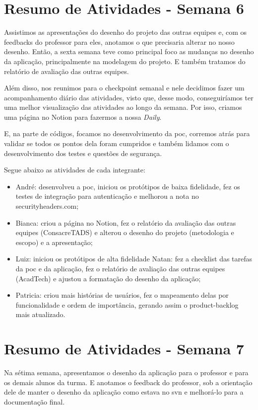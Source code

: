 \begin{apendicesenv}
\section{Resumo de Atividades - Semana 6}
Assistimos as apresentações do desenho do projeto das outras equipes e, com os \glspl{feedback} do professor para eles, anotamos o que precisaria alterar no nosso desenho. Então, a sexta semana teve como principal foco as mudanças no desenho da aplicação, principalmente na modelagem do projeto. E também tratamos do relatório de avaliação das outras equipes.

Além disso, nos reunimos para o \gls{checkpoint} semanal e nele decidimos fazer um acompanhamento diário das atividades, visto que, desse modo, conseguiríamos ter uma melhor visualização das atividades ao longo da semana. Por isso, criamos uma página no Notion para fazermos a nossa \textit{Daily}.

E, na parte de códigos, focamos no desenvolvimento da \ac{poc}, corremos atrás para validar se todos os pontos dela foram cumpridos e também lidamos com o desenvolvimento dos testes e questões de segurança.

Segue abaixo as atividades de cada integrante:

\begin{itemize}
\item André: desenvolveu a \ac{poc}, iniciou os protótipos de baixa fidelidade, fez os testes de integração para autenticação e melhorou a nota no securityheaders.com;
\item Bianca: criou a página no Notion, fez o relatório da avaliação das outras equipes (ConsacreTADS) e alterou o desenho do projeto (metodologia e escopo) e a apresentação;
\item Luiz: iniciou os protótipos de alta fidelidade
Natan: fez a \gls{checklist} das tarefas da \ac{poc} e da aplicação, fez o relatório de avaliação das outras equipes (AcadTech) e ajustou a formatação do desenho da aplicação;
\item Patricia: criou mais histórias de usuários, fez o mapeamento delas por funcionalidade e ordem de importância, gerando assim o \gls{product-backlog} mais atualizado.
\end{itemize}

\section{Resumo de Atividades - Semana 7}
Na sétima semana, apresentamos o desenho da aplicação para o professor e para os demais alunos da turma. E anotamos o feedback do professor, sob a orientação dele de manter o desenho da aplicação como estava no \ac{svn} e melhorá-lo para a documentação final.


\end{apendicesenv}
